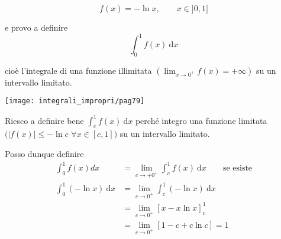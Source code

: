 	
\begin{exbar}
\begin{example}
	\begin{equation*}
		f(x)=-\ln x, \qquad x \in ]0,1]
	\end{equation*}
	
	e provo a definire 
	\begin{equation*}
		\int_{0}^{1} f(x) \ \mathrm{d}x
	\end{equation*}
	
	cioè l'integrale di una funzione illimitata $\left( \lim_{x \rightarrow 0^+} f(x) = + \infty \right)$ su un intervallo limitato.
	\begin{center}
		\texttt{[image: integrali\_impropri/pag79]}
		\label{fig:pag79}
	\end{center}
	
	Riesco a definire bene $\int_{c}^{1} f(x) \ \mathrm{d}x$ perché integro una funzione limitata
	$( |f(x)|\leq -\ln c$ $\forall x \in [c,1] )$ su un intervallo limitato.
	
	Posso dunque definire
	\begin{align*}
		\int_{0}^{1} f(x)dx 
		&= \lim_{c\rightarrow +0^+} \int_{c}^{1} f(x) \ \mathrm{d}x \qquad \text{se esiste}
		\\
		\int_{0}^{1}(-\ln x) \ \mathrm{d}x 
		&= \lim_{c \rightarrow 0^+} \int_{c}^{1} (-\ln x) \ \mathrm{d} x
		\\
		&= \lim_{c \rightarrow 0^+} [x-x\ln x]_{c}^{1} 
		\\
		&= \lim_{c \rightarrow 0^+} [1-c+c\ln c]=1
	\end{align*}
\end{example}
\end{exbar}

